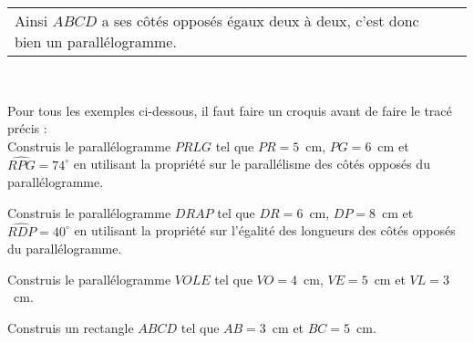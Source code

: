 \begin{methode*1}
\begin{exemple*1}
\begin{tabularx}{\textwidth}{X|X|X}
Ainsi $ABCD$ a ses côtés opposés égaux deux à deux, c'est donc bien un parallélogramme.\\
\end{tabularx} \\
 
 \end{exemple*1}

Pour tous les exemples ci-dessous, il faut faire un croquis avant de faire le tracé précis :\\[-2.5em]
\exercice
Construis le parallélogramme $PRLG$ tel que $PR = 5$ cm, $PG = 6$ cm et  $\widehat{RPG} = 74^\circ$ en utilisant la propriété sur le parallélisme des côtés opposés du parallélogramme.

\exercice
Construis le parallélogramme $DRAP$ tel que $DR = 6$ cm, $DP = 8$ cm et $\widehat{RDP} = 40^\circ$ en utilisant la propriété sur l'égalité des longueurs des côtés opposés du parallélogramme.

\exercice
Construis le parallélogramme $VOLE$ tel que $VO = 4$ cm, $VE = 5$ cm et $VL = 3$ cm.

\exercice
Construis un rectangle $ABCD$ tel que $AB = 3$ cm et $BC = 5$ cm.

\end{methode*1}


